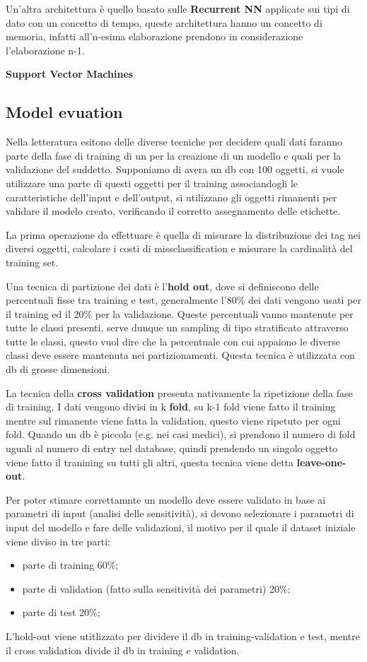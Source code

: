 \documentclass[12pt]{article}
\begin{document}
Un'altra architettura \`e quello basato sulle \textbf{Recurrent NN} applicate sui tipi di dato con un concetto di tempo, queste architettura hanno un concetto di memoria, infatti all'n-esima elaborazione prendono in considerazione l'elaborazione n-1.

\textbf{Support Vector Machines}



\subsection{Model evuation}
Nella letteratura esitono delle diverse tecniche per decidere quali dati faranno parte della fase di training di un per la creazione di un modello e quali per la validazione del suddetto. Supponiamo di avera un db con 100 oggetti, si vuole utilizzare una parte di questi oggetti per il training associandogli le caratteristiche dell'input e dell'output, si utilizzano gli oggetti rimanenti per validare il modelo creato, verificando il corretto assegnamento delle etichette. 

La prima operazione da effettuare \`e quella di misurare la distribuzione dei tag nei diversi oggetti, calcolare i costi di missclassification e misurare la cardinalit\`a del training set.

Una tecnica di partizione dei dati \`e l'\textbf{hold out}, dove si definiscono delle percentuali fisse tra training e test, generalmente l'80\% dei dati vengono usati per il training ed il 20\% per la validazione. Queste percentuali vanno mantenute per tutte le classi presenti, serve dunque un sampling di tipo stratificato attraverso tutte le classi, questo vuol dire che la percentuale con cui appaiono le diverse classi deve essere mantenuta nei partizionamenti. Questa tecnica \`e utilizzata con db di grosse dimensioni.

La tecnica della \textbf{cross validation} presenta nativamente la ripetizione della fase di training. I dati vengono divisi in k \textbf{fold}, su k-1 fold viene fatto il training mentre sul rimanente viene fatta la validation, questo viene ripetuto per ogni fold. Quando un db \`e piccolo (e.g. nei casi medici), si prendono il numero di fold uguali al numero di entry nel database, quindi prendendo un singolo oggetto viene fatto il tranining su tutti gli altri, questa tecnica viene detta \textbf{leave-one-out}.

Per poter stimare correttamnte un modello deve essere validato in base ai parametri di input (analisi delle sensitivit\`a), si devono selezionare i parametri di input del modello e fare delle validazioni, il motivo per il quale il dataset iniziale viene diviso in tre parti:
\begin{itemize}
    \item parte di training 60\%;
    \item parte di validation (fatto sulla sensitivit\`a dei parametri) 20\%;
    \item parte di test 20\%;
\end{itemize}
L'hold-out viene utitlizzato per dividere il db in training-validation e test, mentre il cross validation divide il db in training e validation.
\end{document}
